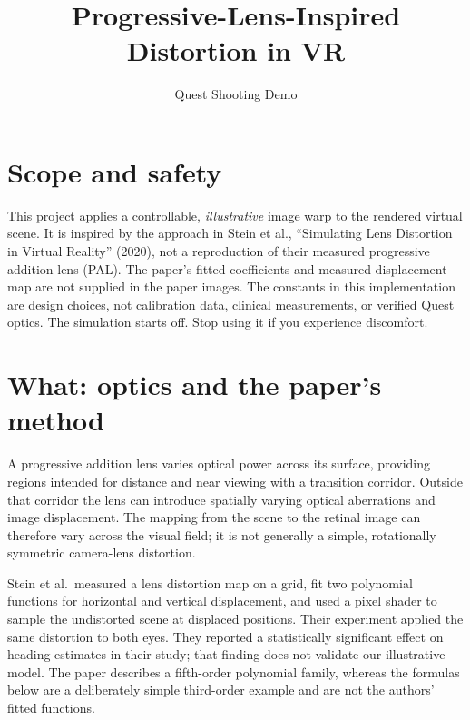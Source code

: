 \documentclass[11pt,a4paper]{article}
\title{Progressive-Lens-Inspired Distortion in VR}
\author{Quest Shooting Demo}
\date{}
\begin{document}
\maketitle

\section{Scope and safety}
This project applies a controllable, \emph{illustrative} image warp to the
rendered virtual scene. It is inspired by the approach in Stein et al.,
``Simulating Lens Distortion in Virtual Reality'' (2020), not a reproduction
of their measured progressive addition lens (PAL). The paper's fitted
coefficients and measured displacement map are not supplied in the paper
images. The constants in this implementation are design choices, not
calibration data, clinical measurements, or verified Quest optics. The
simulation starts off. Stop using it if you experience discomfort.

\section{What: optics and the paper's method}
A progressive addition lens varies optical power across its surface, providing
regions intended for distance and near viewing with a transition corridor.
Outside that corridor the lens can introduce spatially varying optical
aberrations and image displacement. The mapping from the scene to the retinal
image can therefore vary across the visual field; it is not generally a
simple, rotationally symmetric camera-lens distortion.

Stein et al.\ measured a lens distortion map on a grid, fit two polynomial
functions for horizontal and vertical displacement, and used a pixel shader to
sample the undistorted scene at displaced positions. Their experiment applied
the same distortion to both eyes. They reported a statistically significant
effect on heading estimates in their study; that finding does not validate our
illustrative model. The paper describes a fifth-order polynomial family,
whereas the formulas below are a deliberately simple third-order example and
are not the authors' fitted functions.
\end{document}
